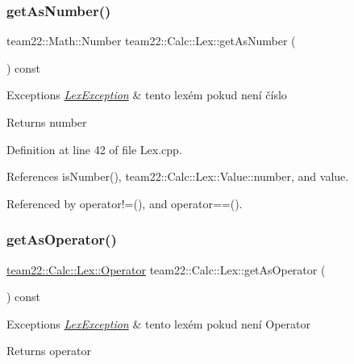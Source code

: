 \subsubsection{\texorpdfstring{get\+As\+Number()}{getAsNumber()}}
{\footnotesize\ttfamily team22\+::\+Math\+::\+Number team22\+::\+Calc\+::\+Lex\+::get\+As\+Number (\begin{DoxyParamCaption}{ }\end{DoxyParamCaption}) const}


\begin{DoxyExceptions}{Exceptions}
{\em \hyperlink{classteam22_1_1_calc_1_1_lex_exception}{Lex\+Exception}} & tento lexém pokud není číslo \\
\hline
\end{DoxyExceptions}
\begin{DoxyReturn}{Returns}
number 
\end{DoxyReturn}


Definition at line 42 of file Lex.\+cpp.



References is\+Number(), team22\+::\+Calc\+::\+Lex\+::\+Value\+::number, and value.



Referenced by operator!=(), and operator==().

\mbox{\label{classteam22_1_1_calc_1_1_lex_afdeee7e9b13fcb9826d4d8fd7d5f141f}} 
\subsubsection{\texorpdfstring{get\+As\+Operator()}{getAsOperator()}}
{\footnotesize\ttfamily \hyperlink{classteam22_1_1_calc_1_1_lex_a61d29fc4878a3b36d2de2f13c56ed932}{team22\+::\+Calc\+::\+Lex\+::\+Operator} team22\+::\+Calc\+::\+Lex\+::get\+As\+Operator (\begin{DoxyParamCaption}{ }\end{DoxyParamCaption}) const}


\begin{DoxyExceptions}{Exceptions}
{\em \hyperlink{classteam22_1_1_calc_1_1_lex_exception}{Lex\+Exception}} & tento lexém pokud není Operator \\
\hline
\end{DoxyExceptions}
\begin{DoxyReturn}{Returns}
operator 
\end{DoxyReturn}


